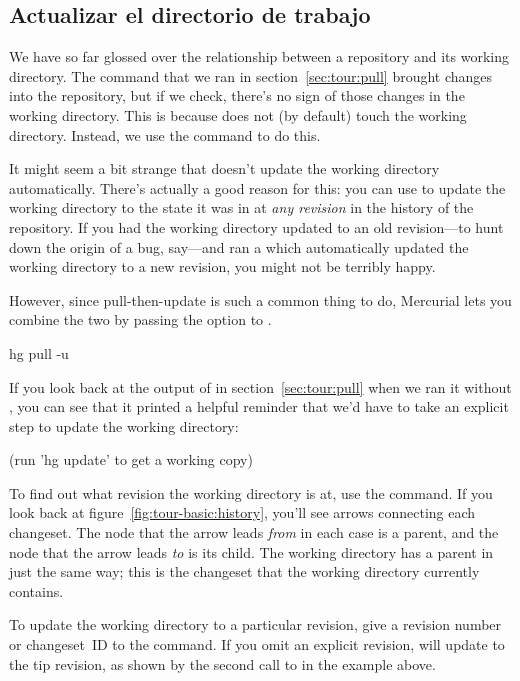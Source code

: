 \subsection{Actualizar el directorio de trabajo}

We have so far glossed over the relationship between a repository and
its working directory.  The  command that we ran in
section~\ref{sec:tour:pull} brought changes into the repository, but
if we check, there's no sign of those changes in the working
directory.  This is because  does not (by default) touch
the working directory.  Instead, we use the  command to
do this.

It might seem a bit strange that  doesn't update the
working directory automatically.  There's actually a good reason for
this: you can use  to update the working directory to
the state it was in at \emph{any revision} in the history of the
repository.  If you had the working directory updated to an old
revision---to hunt down the origin of a bug, say---and ran a
 which automatically updated the working directory to a
new revision, you might not be terribly happy.

However, since pull-then-update is such a common thing to do,
Mercurial lets you combine the two by passing the 
option to .
\begin{codesample2}
  hg pull -u
\end{codesample2}
If you look back at the output of  in
section~\ref{sec:tour:pull} when we ran it without ,
you can see that it printed a helpful reminder that we'd have to take
an explicit step to update the working directory:
\begin{codesample2}
  (run 'hg update' to get a working copy)
\end{codesample2}

To find out what revision the working directory is at, use the
 command.
If you look back at figure~\ref{fig:tour-basic:history}, you'll see
arrows connecting each changeset.  The node that the arrow leads
\emph{from} in each case is a parent, and the node that the arrow
leads \emph{to} is its child.  The working directory has a parent in
just the same way; this is the changeset that the working directory
currently contains.

To update the working directory to a particular revision, give a
revision number or changeset~ID to the  command.
If you omit an explicit revision,  will update to the
tip revision, as shown by the second call to  in the
example above.

